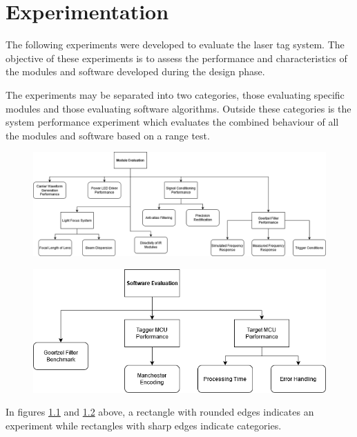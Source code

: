 \chapter{Experimentation}
\label{ch_experimentation}
The following experiments were developed to evaluate the laser tag system. The objective of these experiments is to assess the performance and characteristics of the modules and software developed during the design phase.

The experiments may be separated into two categories, those evaluating specific modules and those evaluating software algorithms. Outside these categories is the system performance experiment which evaluates the combined behaviour of all the modules and software based on a range test.

\begin{figure}[H]
	\centering
	\includegraphics[width=\linewidth]{figures/experimentation/experiments_overview_module_evaluation.png}
	\label{fig:experiments_overview_module_evaluation}
\end{figure}

\begin{figure}[H]
	\centering
	\includegraphics[width=.7\linewidth]{figures/experimentation/experiments_overview_software_evaluation.png}
	\label{fig:experiments_overview_software_evaluation}
\end{figure}

In figures \ref{fig:experiments_overview_module_evaluation} and \ref{fig:experiments_overview_software_evaluation} above, a rectangle with rounded edges indicates an experiment while rectangles with sharp edges indicate categories.




